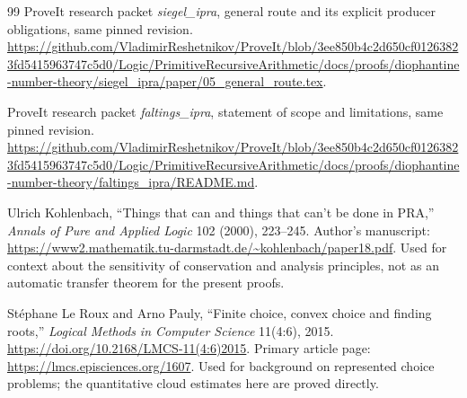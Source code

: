 \begin{thebibliography}{99}
ProveIt research packet \emph{siegel\_ipra}, general route and its explicit producer obligations, same pinned revision.
\url{https://github.com/VladimirReshetnikov/ProveIt/blob/3ee850b4c2d650cf01263823fd5415963747c5d0/Logic/PrimitiveRecursiveArithmetic/docs/proofs/diophantine-number-theory/siegel_ipra/paper/05_general_route.tex}.

ProveIt research packet \emph{faltings\_ipra}, statement of scope and limitations, same pinned revision.
\url{https://github.com/VladimirReshetnikov/ProveIt/blob/3ee850b4c2d650cf01263823fd5415963747c5d0/Logic/PrimitiveRecursiveArithmetic/docs/proofs/diophantine-number-theory/faltings_ipra/README.md}.

Ulrich Kohlenbach, ``Things that can and things that can't be done in PRA,'' \emph{Annals of Pure and Applied Logic} 102 (2000), 223--245. Author's manuscript:
\url{https://www2.mathematik.tu-darmstadt.de/~kohlenbach/paper18.pdf}.
Used for context about the sensitivity of conservation and analysis principles, not as an automatic transfer theorem for the present proofs.

St\'ephane Le Roux and Arno Pauly, ``Finite choice, convex choice and finding roots,'' \emph{Logical Methods in Computer Science} 11(4:6), 2015.
\url{https://doi.org/10.2168/LMCS-11(4:6)2015}.
Primary article page: \url{https://lmcs.episciences.org/1607}.
Used for background on represented choice problems; the quantitative cloud estimates here are proved directly.
\end{thebibliography}
